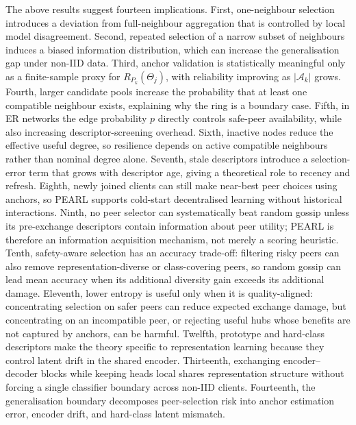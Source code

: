 \documentclass[conference]{IEEEtran}
\begin{document}
The above results suggest fourteen implications. First, one-neighbour selection introduces a deviation from full-neighbour aggregation that is controlled by local model disagreement. Second, repeated selection of a narrow subset of neighbours induces a biased information distribution, which can increase the generalisation gap under non-IID data. Third, anchor validation is statistically meaningful only as a finite-sample proxy for \(R_{P_k}(\Theta_j)\), with reliability improving as \(|\mathcal{A}_k|\) grows. Fourth, larger candidate pools increase the probability that at least one compatible neighbour exists, explaining why the ring is a boundary case. Fifth, in ER networks the edge probability \(p\) directly controls safe-peer availability, while also increasing descriptor-screening overhead. Sixth, inactive nodes reduce the effective useful degree, so resilience depends on active compatible neighbours rather than nominal degree alone. Seventh, stale descriptors introduce a selection-error term that grows with descriptor age, giving a theoretical role to recency and refresh. Eighth, newly joined clients can still make near-best peer choices using anchors, so PEARL supports cold-start decentralised learning without historical interactions. Ninth, no peer selector can systematically beat random gossip unless its pre-exchange descriptors contain information about peer utility; PEARL is therefore an information acquisition mechanism, not merely a scoring heuristic. Tenth, safety-aware selection has an accuracy trade-off: filtering risky peers can also remove representation-diverse or class-covering peers, so random gossip can lead mean accuracy when its additional diversity gain exceeds its additional damage. Eleventh, lower entropy is useful only when it is quality-aligned: concentrating selection on safer peers can reduce expected exchange damage, but concentrating on an incompatible peer, or rejecting useful hubs whose benefits are not captured by anchors, can be harmful. Twelfth, prototype and hard-class descriptors make the theory specific to representation learning because they control latent drift in the shared encoder. Thirteenth, exchanging encoder--decoder blocks while keeping heads local shares representation structure without forcing a single classifier boundary across non-IID clients. Fourteenth, the generalisation boundary decomposes peer-selection risk into anchor estimation error, encoder drift, and hard-class latent mismatch.
\end{document}

